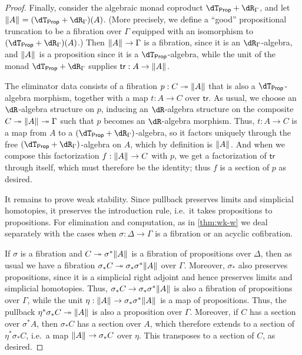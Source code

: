 \documentclass{amsart}
\def\dtprop{\dT_{\mathsf{Prop}}}
\def\tr{\mathsf{tr}}
\begin{document}
\begin{proof}
  Finally, consider the algebraic monad coproduct $\dtprop + \dR_\Gamma$, and let $\brck A = (\dtprop+\dR_\Gamma)(A)$.
  (More precisely, we define a ``good'' propositional truncation to be a fibration over $\Gamma$ equipped with an isomorphism to $(\dtprop+\dR_\Gamma)(A)$.)
  Then $\mathopen{}\left\Vert A\right\Vert_{}\mathclose{} \to \Gamma$ is a fibration, since it is an $\dR_\Gamma$-algebra, and $\mathopen{}\left\Vert A\right\Vert_{}\mathclose{}$ is a proposition since it is a $\dtprop$-algebra, while the unit of the monad $\dtprop + \dR_\Gamma$ supplies $\tr:A\to\brck A$.

  The eliminator data consists of a fibration $p:C\twoheadrightarrow \mathopen{}\left\Vert A\right\Vert_{}\mathclose{}$ that is also a $\dtprop$-algebra morphism, together with a map $t:A\to C$ over $\tr$.
  As usual, we choose an $\dR$-algebra structure on $p$, inducing an $\dR$-algebra structure on the composite $C\twoheadrightarrow \mathopen{}\left\Vert A\right\Vert_{}\mathclose{} \twoheadrightarrow \Gamma$ such that $p$ becomes an $\dR$-algebra morphism.
  Thus, $t:A\to C$ is a map from $A$ to a $(\dtprop+\dR_\Gamma)$-algebra, so it factors uniquely through the free $(\dtprop+\dR_\Gamma)$-algebra on $A$, which by definition is $\mathopen{}\left\Vert A\right\Vert_{}\mathclose{}$.
  And when we compose this factorization $f:\mathopen{}\left\Vert A\right\Vert_{}\mathclose{} \to C$ with $p$, we get a factorization of $\tr$ through itself, which must therefore be the identity; thus $f$ is a section of $p$ as desired.

  It remains to prove weak stability.
  Since pullback preserves limits and simplicial homotopies, it preserves the introduction rule, i.e.\ it takes propositions to propositions.
  For elimination and computation, as in \cref{thm:wk-w} we deal separately with the cases when $\sigma:\Delta\to\Gamma$ is a fibration or an acyclic cofibration.

  If $\sigma$ is a fibration and $C\twoheadrightarrow \sigma^*\mathopen{}\left\Vert A\right\Vert_{}\mathclose{}$ is a fibration of propositions over $\Delta$, then as usual we have a fibration $\sigma_* C \twoheadrightarrow \sigma_* \sigma^* \mathopen{}\left\Vert A\right\Vert_{}\mathclose{}$ over $\Gamma$.
  Moreover, $\sigma_*$ also preserves propositions, since it is a simplicial right adjoint and hence preserves limits and simplicial homotopies.
  Thus, $\sigma_* C\to\sigma_*\sigma^*\mathopen{}\left\Vert A\right\Vert_{}\mathclose{}$ is also a fibration of propositions over $\Gamma$, while the unit $\eta : \mathopen{}\left\Vert A\right\Vert_{}\mathclose{} \to \sigma_* \sigma^* \mathopen{}\left\Vert A\right\Vert_{}\mathclose{}$ is a map of propositions.
  Thus, the pullback $\eta^* \sigma_* C \twoheadrightarrow \mathopen{}\left\Vert A\right\Vert_{}\mathclose{}$ is also a proposition over $\Gamma$.
  Moreover, if $C$ has a section over $\sigma^*A$, then $\sigma_* C$ has a section over $A$, which therefore extends to a section of $\eta^* \sigma_* C$, i.e.\ a map $\mathopen{}\left\Vert A\right\Vert_{}\mathclose{} \to \sigma_* C$ over $\eta$.
  This transposes to a section of $C$, as desired.


\end{proof}
\end{document}
